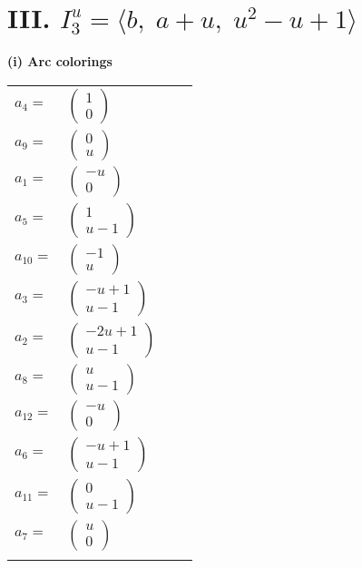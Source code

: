 \documentclass[1p]{elsarticle_modified}
\theoremstyle{definition}
\begin{document}
\centering \section*{III. $I^u_{3}= \langle b,\;a+u,\;u^2- u+1 \rangle$}
\flushleft \textbf{(i) Arc colorings}\\
\begin{tabular}{m{7pt} m{180pt} m{7pt} m{180pt} }
\flushright $a_{4}=$&$\begin{pmatrix}1\\0\end{pmatrix}$ \\
\flushright $a_{9}=$&$\begin{pmatrix}0\\u\end{pmatrix}$ \\
\flushright $a_{1}=$&$\begin{pmatrix}- u\\0\end{pmatrix}$ \\
\flushright $a_{5}=$&$\begin{pmatrix}1\\u-1\end{pmatrix}$ \\
\flushright $a_{10}=$&$\begin{pmatrix}-1\\u\end{pmatrix}$ \\
\flushright $a_{3}=$&$\begin{pmatrix}- u+1\\u-1\end{pmatrix}$ \\
\flushright $a_{2}=$&$\begin{pmatrix}-2 u+1\\u-1\end{pmatrix}$ \\
\flushright $a_{8}=$&$\begin{pmatrix}u\\u-1\end{pmatrix}$ \\
\flushright $a_{12}=$&$\begin{pmatrix}- u\\0\end{pmatrix}$ \\
\flushright $a_{6}=$&$\begin{pmatrix}- u+1\\u-1\end{pmatrix}$ \\
\flushright $a_{11}=$&$\begin{pmatrix}0\\u-1\end{pmatrix}$ \\
\flushright $a_{7}=$&$\begin{pmatrix}u\\0\end{pmatrix}$\\&\end{tabular}
\end{document}
